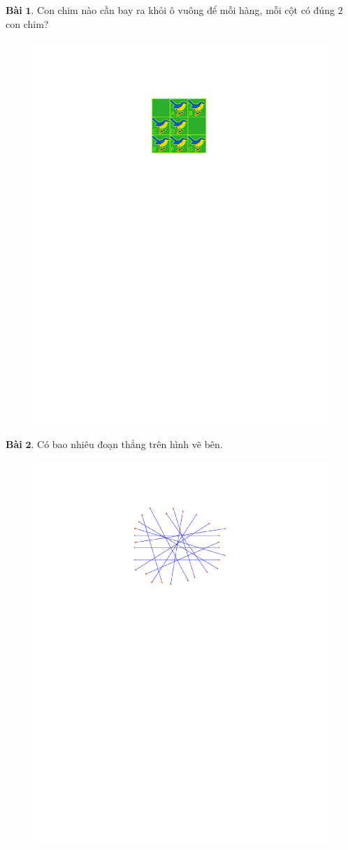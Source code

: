 \begin{multicols}{2}
	\textbf{\color{toancuabi}Bài} $\pmb{1.}$ Con chim nào cần bay ra khỏi ô vuông để mỗi hàng, mỗi cột có đúng $2$ con chim?
	\begin{figure}[H]
		\vspace*{-5pt}
		\centering
		\captionsetup{labelformat= empty, justification=centering}
		\includegraphics[width= 0.7\linewidth]{bai1k3}
		\vspace*{-10pt}
	\end{figure}
	\textbf{\color{toancuabi}Bài} $\pmb{2.}$ Có bao nhiêu đoạn thẳng trên hình vẽ bên.
	\begin{figure}[H]
		\vspace*{-5pt}
		\centering
		\captionsetup{labelformat= empty, justification=centering}
		\includegraphics[width= 0.75\linewidth]{bai2k3}

\end{figure}
\end{multicols}
